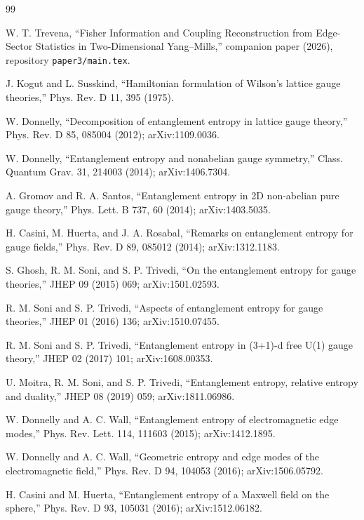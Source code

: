 \documentclass[11pt]{article}
\theoremstyle{remark}
\theoremstyle{plain}
\begin{document}
\begin{thebibliography}{99}

 W. T. Trevena, ``Fisher Information and Coupling Reconstruction from Edge-Sector Statistics in Two-Dimensional Yang--Mills,'' companion paper (2026), repository \texttt{paper3/main.tex}.

 J. Kogut and L. Susskind, ``Hamiltonian formulation of Wilson's lattice gauge theories,'' Phys. Rev. D 11, 395 (1975).

 W. Donnelly, ``Decomposition of entanglement entropy in lattice gauge theory,'' Phys. Rev. D 85, 085004 (2012); arXiv:1109.0036.

 W. Donnelly, ``Entanglement entropy and nonabelian gauge symmetry,'' Class. Quantum Grav. 31, 214003 (2014); arXiv:1406.7304.

 A. Gromov and R. A. Santos, ``Entanglement entropy in 2D non-abelian pure gauge theory,'' Phys. Lett. B 737, 60 (2014); arXiv:1403.5035.

 H. Casini, M. Huerta, and J. A. Rosabal, ``Remarks on entanglement entropy for gauge fields,'' Phys. Rev. D 89, 085012 (2014); arXiv:1312.1183.

 S. Ghosh, R. M. Soni, and S. P. Trivedi, ``On the entanglement entropy for gauge theories,'' JHEP 09 (2015) 069; arXiv:1501.02593.

 R. M. Soni and S. P. Trivedi, ``Aspects of entanglement entropy for gauge theories,'' JHEP 01 (2016) 136; arXiv:1510.07455.

 R. M. Soni and S. P. Trivedi, ``Entanglement entropy in (3+1)-d free U(1) gauge theory,'' JHEP 02 (2017) 101; arXiv:1608.00353.

 U. Moitra, R. M. Soni, and S. P. Trivedi, ``Entanglement entropy, relative entropy and duality,'' JHEP 08 (2019) 059; arXiv:1811.06986.

 W. Donnelly and A. C. Wall, ``Entanglement entropy of electromagnetic edge modes,'' Phys. Rev. Lett. 114, 111603 (2015); arXiv:1412.1895.

 W. Donnelly and A. C. Wall, ``Geometric entropy and edge modes of the electromagnetic field,'' Phys. Rev. D 94, 104053 (2016); arXiv:1506.05792.

 H. Casini and M. Huerta, ``Entanglement entropy of a Maxwell field on the sphere,'' Phys. Rev. D 93, 105031 (2016); arXiv:1512.06182.


\end{thebibliography}
\end{document}
